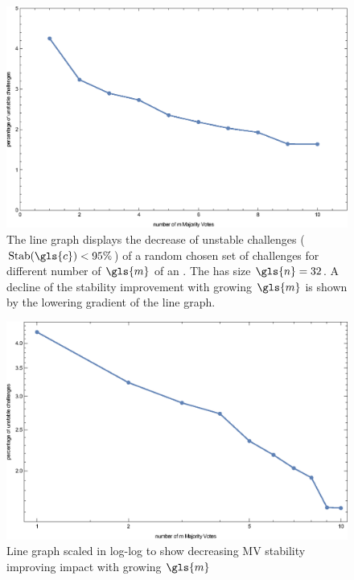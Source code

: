 \begin{figure}[ht]
\includegraphics[width=1.00\textwidth]{images/single-votes-stab-simulation.eps}
\caption[Decrease of unstable challenges of a \mpuf]{The line graph displays the decrease of unstable challenges ($\Stab(\gls{c}) < 95 \%$) of a random chosen set of challenges for different number of $\gls{m}$ of an \mpuf.
The \mpuf has size $\gls{n} = 32$.
A decline of the stability improvement with growing $\gls{m}$ is shown by the lowering gradient of the line graph.
} 
\label{fig:majorityvotestabilityimprovement}
\end{figure}

\begin{figure}[ht]
\includegraphics[width=1.00\textwidth]{images/single-votes-stab-simulation_loglog.eps}
\caption[Decreasing improvement impact by \acs{MV} of a \mpuf]{Line graph scaled in log-log to show decreasing \ac{MV} stability improving impact with growing $\gls{m}$} 
\label{fig:majorityvotestabilityimprovementloglog}
\end{figure}

